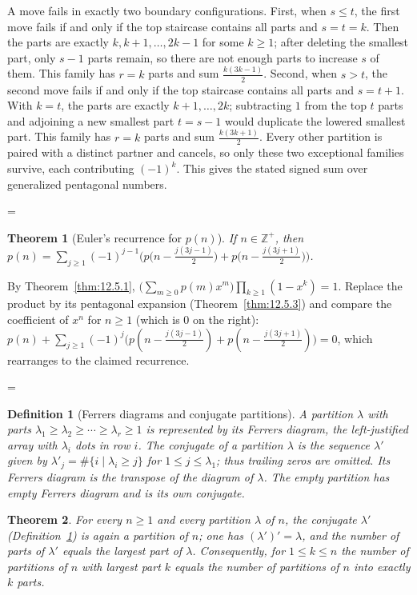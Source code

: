 \documentclass[11pt]{article}
\makeatletter
\theoremstyle{ntstyle}
\newtheorem{theorem}{Theorem}[subsection]
\newtheorem{definition}{Definition}[subsection]
\let\nt@closedisplay\]
\def\nt@guardedclose{\@ifnextchar\par{\nt@closeafterpar}{\@ifnextchar\end{\postdisplaypenalty\@M\nt@closedisplay}{\nt@closedisplay}}}
\def\nt@closeafterpar\par{\@ifnextchar\par{\nt@closeafterpar}{\@ifnextchar\end{\postdisplaypenalty\@M\nt@closedisplay\par}{\nt@closedisplay\par}}}
\renewenvironment{proof}[1][\proofname]{\par
  \pushQED{\qed}\normalfont\topsep\medskipamount\edef\nt@afterproof{\@endparpenalty=\the\@endparpenalty\relax}\@beginparpenalty\@M\@endparpenalty\@M\let\]\nt@guardedclose\trivlist\item[]\textit{#1\@addpunct{.}} \ignorespaces}{\ifvmode\addpenalty\@M\fi\popQED\nt@afterproof\endtrivlist\@endpefalse}
\makeatother
\begin{document}
\begin{proof}
	A move fails in exactly two boundary configurations. First, when
	$s\le t$, the first move fails if and only if the top staircase
	contains all parts and $s=t=k$. Then the parts are exactly
	$k,k+1,\ldots,2k-1$ for some $k\ge1$; after deleting the smallest part,
	only $s-1$ parts remain, so there are not enough parts to increase $s$ of them.
	This family has $r=k$ parts and sum $\tfrac{k(3k-1)}{2}$. Second, when
	$s>t$, the second move fails if and only if the top staircase
	contains all parts and $s=t+1$. With $k=t$, the parts are
	exactly $k+1,\ldots,2k$; subtracting $1$ from the top $t$ parts
	and adjoining a new smallest part $t=s-1$ would duplicate the
	lowered smallest part. This family has $r=k$ parts and sum
	$\tfrac{k(3k+1)}{2}$. Every other partition is
	paired with a distinct partner and cancels, so only these two
	exceptional families survive, each contributing $(-1)^k$. This gives
	the stated signed sum over generalized pentagonal numbers.

\end{proof}
\begin{theorem}[Euler's recurrence for $p(n)$]\label{thm:12.5.4} If $n\in\mathbb{Z}^+$, then
	$p(n)=\sum_{j\ge1}(-1)^{j-1}\Big(p\big(n-\tfrac{j(3j-1)}{2}\big)+p\big(n-\tfrac{j(3j+1)}{2}\big)\Big)$.

\end{theorem}

\begin{proof} By Theorem~\ref{thm:12.5.1},
	$\big(\sum_{m\ge0}p(m)x^m\big)\prod_{k\ge1}(1-x^k)=1$. Replace the
	product by its pentagonal expansion (Theorem~\ref{thm:12.5.3}) and compare the
	coefficient of $x^n$ for $n\ge1$ (which is $0$ on the right):
	$p(n)+\sum_{j\ge1}(-1)^j\big(p(n-\tfrac{j(3j-1)}{2})+p(n-\tfrac{j(3j+1)}{2})\big)=0$,
	which rearranges to the claimed recurrence.

\end{proof}
\begin{definition}[Ferrers diagrams and conjugate partitions]
	\label{def:12.5.2} A partition
	$\lambda$ with parts $\lambda_1\ge\lambda_2\ge\cdots\ge\lambda_r\ge1$
	is represented by its Ferrers diagram, the left-justified array with
	$\lambda_i$ dots in row $i$.
	The conjugate of a partition $\lambda$ is the sequence $\lambda'$ given by
	$\lambda'_j=\#\{i \mid \lambda_i\ge j\}$ for
	$1\le j\le\lambda_1$; thus trailing zeros are omitted. Its Ferrers
	diagram is the transpose of the diagram of $\lambda$. The empty
	partition has empty Ferrers diagram and is its own conjugate.

\end{definition}
\begin{theorem}\label{thm:12.5.5} For every $n\ge1$ and every partition
	$\lambda$ of $n$, the conjugate $\lambda'$ (Definition~\ref{def:12.5.2}) is again a partition of $n$; one has
	$(\lambda')' = \lambda$, and the number of parts of $\lambda'$ equals
	the largest part of $\lambda$. Consequently, for $1\le k\le n$ the
	number of partitions of $n$ with largest part $k$ equals the number
	of partitions of $n$ into exactly $k$ parts.

\end{theorem}
\end{document}
